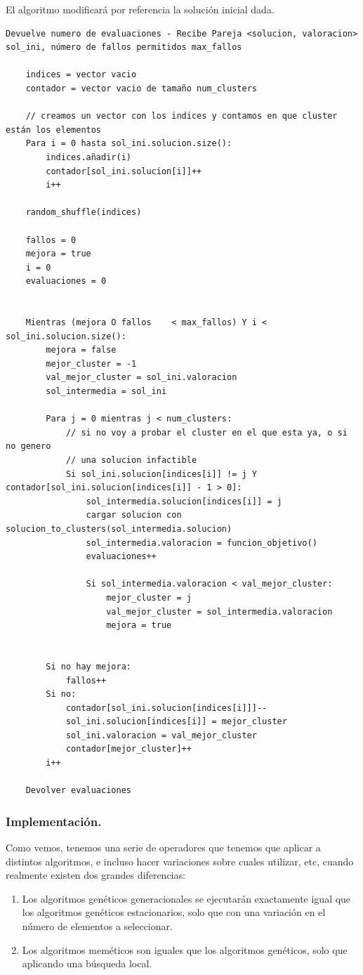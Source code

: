 \documentclass[12pt, spanish]{article}
\begin{document}
El algoritmo modificará por referencia la solución inicial dada.

\begin{lstlisting}
Devuelve numero de evaluaciones - Recibe Pareja <solucion, valoracion> sol_ini, número de fallos permitidos max_fallos

	indices = vector vacio
	contador = vector vacio de tamaño num_clusters
	
	// creamos un vector con los indices y contamos en que cluster están los elementos
	Para i = 0 hasta sol_ini.solucion.size():
		indices.añadir(i)
		contador[sol_ini.solucion[i]]++
		i++
	
	random_shuffle(indices)
	
	fallos = 0
	mejora = true
	i = 0
	evaluaciones = 0
	
	
	Mientras (mejora O fallos	 < max_fallos) Y i < sol_ini.solucion.size():
		mejora = false
		mejor_cluster = -1
		val_mejor_cluster = sol_ini.valoracion
		sol_intermedia = sol_ini
		
		Para j = 0 mientras j < num_clusters:
			// si no voy a probar el cluster en el que esta ya, o si no genero
			// una solucion infactible
			Si sol_ini.solucion[indices[i]] != j Y contador[sol_ini.solucion[indices[i]] - 1 > 0]:
				sol_intermedia.solucion[indices[i]] = j
				cargar solucion con solucion_to_clusters(sol_intermedia.solucion)
				sol_intermedia.valoracion = funcion_objetivo()
				evaluaciones++
				
				Si sol_intermedia.valoracion < val_mejor_cluster:
					mejor_cluster = j
					val_mejor_cluster = sol_intermedia.valoracion
					mejora = true
					
		
		Si no hay mejora:
			fallos++
		Si no:
			contador[sol_ini.solucion[indices[i]]]--
			sol_ini.solucion[indices[i]] = mejor_cluster
			sol_ini.valoracion = val_mejor_cluster
			contador[mejor_cluster]++			
		i++

	Devolver evaluaciones
\end{lstlisting}


\subsubsection{Implementación.}

Como vemos, tenemos una serie de operadores que tenemos que aplicar a distintos algoritmos, e incluso hacer variaciones sobre cuales utilizar, etc, cuando realmente existen dos grandes diferencias:

\begin{enumerate}
	\item Los algoritmos genéticos generacionales se ejecutarán exactamente igual que los algoritmos genéticos estacionarios, solo que con una variación en el número de elementos a seleccionar.
	\item Los algoritmos meméticos son iguales que los algoritmos genéticos, solo que aplicando una búsqueda local.
\end{enumerate}
\end{document}
